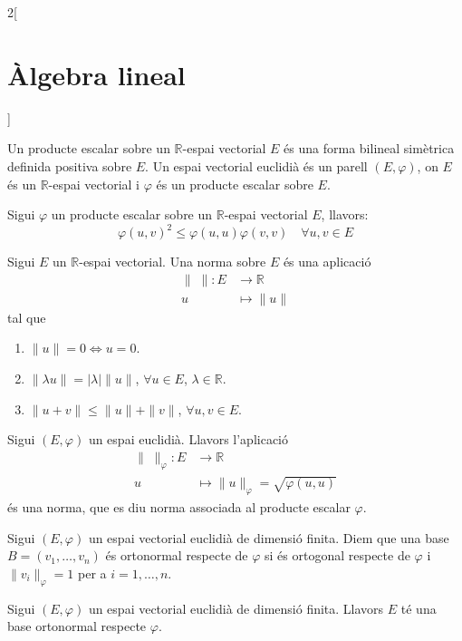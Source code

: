 \documentclass[class=article,10pt,crop=false]{standalone}
\begin{document}
\begin{multicols}{2}[\section{Àlgebra lineal}]
\begin{definition}
Un producte escalar sobre un $\mathbb{R}$-espai vectorial $E$ és una forma bilineal simètrica definida positiva sobre $E$. Un espai vectorial euclidià és un parell $(E,\varphi)$, on $E$ és un $\mathbb{R}$-espai vectorial i $\varphi$ és un producte escalar sobre $E$.\label{espai_euclidia}
\end{definition}
\begin{theorem}
Sigui $\varphi$ un producte escalar sobre un $\mathbb{R}$-espai vectorial $E$, llavors: $$\varphi(u,v)^2\leq \varphi(u,u)\varphi(v,v)\quad\forall u,v\in E$$
\end{theorem}
\begin{definition}
Sigui $E$ un $\mathbb{R}$-espai vectorial. Una norma sobre $E$ és una aplicació \begin{align*}
    \|\;\|:E&\rightarrow\mathbb{R}\\
    u&\mapsto\|u\|
\end{align*}
tal que \begin{enumerate}
    \item $\|u\|=0\iff u=0$.
    \item $\|\lambda u\|=|\lambda|\|u\|$, $\forall u\in E$, $\lambda\in\mathbb{R}$.
    \item $\|u+v\|\leq\|u\|+\|v\|$, $\forall u,v\in E$.
\end{enumerate}
\end{definition}
\begin{prop}
Sigui $(E,\varphi)$ un espai euclidià. Llavors l'aplicació
\begin{align*}
    \|\;\|_\varphi:E&\rightarrow\mathbb{R}\\
    u&\mapsto\|u\|_\varphi=\sqrt{\varphi(u,u)}
\end{align*}
és una norma, que es diu norma associada al producte escalar $\varphi$.
\end{prop}
\begin{definition}
Sigui $(E,\varphi)$ un espai vectorial euclidià de dimensió finita. Diem que una base $B=(v_1,\ldots,v_n)$ és ortonormal respecte de $\varphi$ si és ortogonal respecte de $\varphi$ i $\|v_i\|_\varphi=1$ per a $i=1,\ldots,n$.
\end{definition}
\begin{corollary}
Sigui $(E,\varphi)$ un espai vectorial euclidià de dimensió finita. Llavors $E$ té una base ortonormal respecte $\varphi$.
\end{corollary}
\begin{definition}

\end{definition}
\end{multicols}
\end{document}
